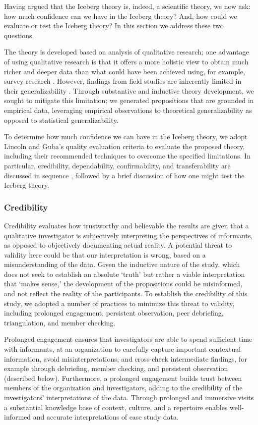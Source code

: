 \documentclass[smallextended]{svjour3}
\begin{document}
Having argued that the Iceberg theory is, indeed, a scientific theory, we now ask: how much confidence can we have in the Iceberg theory? And, how could we evaluate or test the Iceberg theory? In this section we address these two questions.

The theory is developed based on analysis of qualitative research; one advantage of using qualitative research is that it offers a more holistic view to obtain much richer and deeper data than what could have been achieved using, for example, survey research \citep{marshall2014designing}. However, findings from field studies are inherently limited in their generalizability \citep{stol2018abc}. Through substantive and inductive theory development, we sought to mitigate this limitation; we generated propositions that are grounded in empirical data, leveraging empirical observations to theoretical generalizability as opposed to statistical generalizability. 


To determine how much confidence we can have in the Iceberg theory, we adopt Lincoln and Guba's quality evaluation criteria to evaluate the proposed theory, including their recommended techniques to overcome the specified limitations.
In particular, credibility, dependability, confirmability, and transferability are discussed in sequence \citep{lincoln1985naturalistic, guba1994competing}, followed by a brief discussion of how one might test the Iceberg theory.


\subsubsection{Credibility}

Credibility evaluates how trustworthy and believable the results are given that a qualitative investigator is subjectively interpreting the perspectives of informants, as opposed to objectively documenting actual reality.
A potential threat to validity here could be that our interpretation is wrong, based on a misunderstanding of the data. Given the inductive nature of the study, which does not seek to establish an absolute `truth' but rather a viable interpretation that `makes sense,' the development of the propositions could be misinformed, and not reflect the reality of the participants. 
To establish the credibility of this study, we adopted a number of practices to minimize this threat to validity, including prolonged engagement, persistent observation, peer debriefing, triangulation, and member checking.

{Prolonged engagement} ensures that investigators are able to spend sufficient time with informants, at an organization to carefully capture important contextual information, avoid misinterpretations, and cross-check intermediate findings, for example through debriefing, member checking, and persistent observation (described below). 
Furthermore, a prolonged engagement builds trust between members of the organization and investigators, adding to the credibility of the investigators' interpretations of the data.
Through prolonged and immersive visits a substantial knowledge base of context, culture, and a repertoire enables well-informed and accurate interpretations of case study data.
\end{document}

